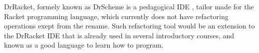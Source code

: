 DrRacket, formely known as DrScheme is a pedagogical IDE \cite{drscheme} \cite{drscheme_pegadogy},
tailor made for the Racket programming language, which currently does not
have refactoring operations exept from the rename.
Such refactoring tool would be an extension to the DrRacket IDE that is already
used in several introductory courses, and known as a good language to learn how to program.


